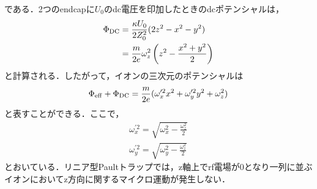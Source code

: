 である．2つのendcapに$U_0$のdc電圧を印加したときのdcポテンシャルは，
\large
\begin{align}
\Phi_{\rm DC} &= \frac{\kappa U_0}{2Z_0^2}(2z^2 - x^2 - y^2) \\
					&= \frac{m}{2e}\omega_z^2 \left(z^2 - \frac{x^2 + y^2}{2}\right)
\end{align}
\normalsize
と計算される．したがって，イオンの三次元のポテンシャルは
\large
\begin{align}\label{eq:3D_harmonic}
\Phi_{\rm eff} + \Phi_{\rm DC} = \frac{m}{2e}(\omega^{\prime 2}_{x} x^2 + \omega^{\prime 2}_{y} y^2 + \omega_z^2)
\end{align}
\normalsize
と表すことができる．ここで，
\large
\begin{align}
\omega^{\prime 2}_x = \sqrt{\omega_x^2 - \frac{\omega_z^2}{2}} \\
\omega^{\prime 2}_y = \sqrt{\omega_y^2 - \frac{\omega_z^2}{2}}
\end{align}
\normalsize
とおいている．リニア型Paultトラップでは，z軸上でrf電場が0となり一列に並ぶイオンにおいてz方向に関するマイクロ運動が発生しない\cite{Berkeland_1998}\cite{URABE}．

